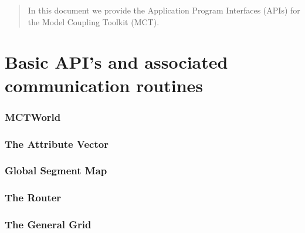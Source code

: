 \documentclass{article}
\begin{document}
\vspace*{\fill}


\newpage
\setcounter{page}{3}     %

\vspace*{\fill}

\begin{abstract}
In this document we provide the Application Program Interfaces (APIs)
for the Model Coupling Toolkit (MCT).
\end{abstract}

\vspace*{\fill}
\newpage

\tableofcontents
\newpage



\part{Basic API's and associated communication routines}
%
\section{MCTWorld}

%
\section{The Attribute Vector}

\vspace*{\fill}
\newpage

\vspace*{\fill}
\newpage

\vspace*{\fill}
\newpage
%
\section{Global Segment Map}

\vspace*{\fill}
\newpage
%
\section{The Router}

\vspace*{\fill}
\newpage
%
\section{The General Grid}

\vspace*{\fill}
\newpage

\vspace*{\fill}
\newpage
%
\end{document}
